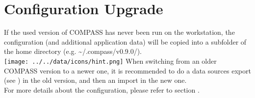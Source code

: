 
\section{Configuration Upgrade}

If the used version of COMPASS has never been run on the workstation, the configuration (and additional application data) will be copied into a subfolder of the home directory (e.g. \textasciitilde/.compass/v0.9.0/). \\

\texttt{[image: ../../data/icons/hint.png]} When switching from an older COMPASS version to a newer one, it is recommended to do a data sources export (see ) in the old version, 
and then an import in the new one. \\

For more details about the configuration, please refer to section .
